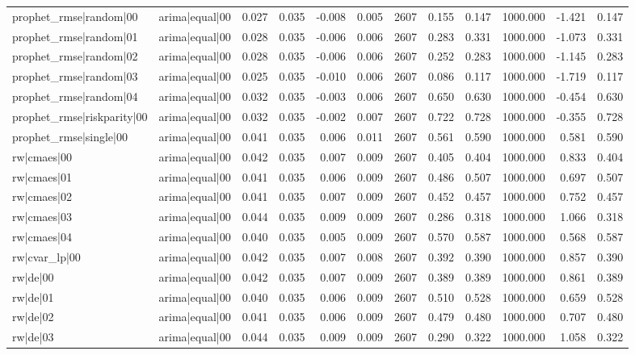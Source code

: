 \begin{table}
\begin{tabular}{llrrrrrrrrrr}
prophet\_rmse|random|00 & arima|equal|00 & 0.027 & 0.035 & -0.008 & 0.005 & 2607 & 0.155 & 0.147 & 1000.000 & -1.421 & 0.147 \\
prophet\_rmse|random|01 & arima|equal|00 & 0.028 & 0.035 & -0.006 & 0.006 & 2607 & 0.283 & 0.331 & 1000.000 & -1.073 & 0.331 \\
prophet\_rmse|random|02 & arima|equal|00 & 0.028 & 0.035 & -0.006 & 0.006 & 2607 & 0.252 & 0.283 & 1000.000 & -1.145 & 0.283 \\
prophet\_rmse|random|03 & arima|equal|00 & 0.025 & 0.035 & -0.010 & 0.006 & 2607 & 0.086 & 0.117 & 1000.000 & -1.719 & 0.117 \\
prophet\_rmse|random|04 & arima|equal|00 & 0.032 & 0.035 & -0.003 & 0.006 & 2607 & 0.650 & 0.630 & 1000.000 & -0.454 & 0.630 \\
prophet\_rmse|riskparity|00 & arima|equal|00 & 0.032 & 0.035 & -0.002 & 0.007 & 2607 & 0.722 & 0.728 & 1000.000 & -0.355 & 0.728 \\
prophet\_rmse|single|00 & arima|equal|00 & 0.041 & 0.035 & 0.006 & 0.011 & 2607 & 0.561 & 0.590 & 1000.000 & 0.581 & 0.590 \\
rw|cmaes|00 & arima|equal|00 & 0.042 & 0.035 & 0.007 & 0.009 & 2607 & 0.405 & 0.404 & 1000.000 & 0.833 & 0.404 \\
rw|cmaes|01 & arima|equal|00 & 0.041 & 0.035 & 0.006 & 0.009 & 2607 & 0.486 & 0.507 & 1000.000 & 0.697 & 0.507 \\
rw|cmaes|02 & arima|equal|00 & 0.041 & 0.035 & 0.007 & 0.009 & 2607 & 0.452 & 0.457 & 1000.000 & 0.752 & 0.457 \\
rw|cmaes|03 & arima|equal|00 & 0.044 & 0.035 & 0.009 & 0.009 & 2607 & 0.286 & 0.318 & 1000.000 & 1.066 & 0.318 \\
rw|cmaes|04 & arima|equal|00 & 0.040 & 0.035 & 0.005 & 0.009 & 2607 & 0.570 & 0.587 & 1000.000 & 0.568 & 0.587 \\
rw|cvar\_lp|00 & arima|equal|00 & 0.042 & 0.035 & 0.007 & 0.008 & 2607 & 0.392 & 0.390 & 1000.000 & 0.857 & 0.390 \\
rw|de|00 & arima|equal|00 & 0.042 & 0.035 & 0.007 & 0.009 & 2607 & 0.389 & 0.389 & 1000.000 & 0.861 & 0.389 \\
rw|de|01 & arima|equal|00 & 0.040 & 0.035 & 0.006 & 0.009 & 2607 & 0.510 & 0.528 & 1000.000 & 0.659 & 0.528 \\
rw|de|02 & arima|equal|00 & 0.041 & 0.035 & 0.006 & 0.009 & 2607 & 0.479 & 0.480 & 1000.000 & 0.707 & 0.480 \\
rw|de|03 & arima|equal|00 & 0.044 & 0.035 & 0.009 & 0.009 & 2607 & 0.290 & 0.322 & 1000.000 & 1.058 & 0.322 \\

\end{tabular}
\end{table}
